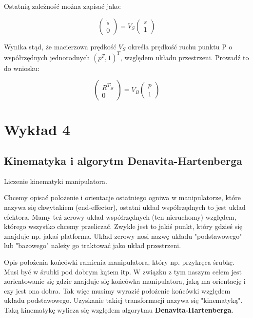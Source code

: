 \documentclass{article}
\begin{document}
Ostatnią zależność można zapisać jako:

$$
    \begin{pmatrix}
        \dot s \\[0.3em]
        0
    \end{pmatrix}
    =V_{S}
    \begin{pmatrix}
        s \\[0.3em]
        1
    \end{pmatrix}
$$

Wynika stąd, że macierzowa prędkość $V_{S}$ określa prędkość ruchu punktu P o współrzędnych jednorodnych $(p^{T}, 1)^{T}$, względem układu przestrzeni. Prowadź to do wniosku:

$$
    \begin{pmatrix}
        R^{T}\dot s \\[0.3em]
        0
    \end{pmatrix}
    =V_{B}
    \begin{pmatrix}
        p \\[0.3em]
        1
    \end{pmatrix}
$$


\newpage

\section{Wykład 4}

\subsection{Kinematyka i algorytm Denavita-Hartenberga}

Liczenie kinematyki manipulatora.

Chcemy opisać położenie i orientacje ostatniego ogniwa w manipulatorze, które nazywa się chwytakiem (end-effector), ostatni układ współrzędnych to jest układ efektora. Mamy też zerowy układ współrzędnych (ten nieruchomy) względem, którego wszystko chcemy przeliczać. Zwykle jest to jakiś punkt, który gdzieś się znajduje np. jakaś platforma. Układ zerowy nosi nazwę układu "podstawowego" lub "bazowego" należy go traktować jako układ przestrzeni.

Opis położenia końcówki ramienia manipulatora, który np. przykręca śrubkę. Musi być w śrubki pod dobrym kątem itp. W związku z tym naszym celem jest zorientowanie się gdzie znajduje się końcówka manipulatora, jaką ma orientację i czy jest ona dobra.
Tak więc musimy wyrazić położenie końcówki względem układu podstawowego. Uzyskanie takiej transformacji nazywa się "kinematyką".
Taką kinematykę wylicza się względem algorytmu {\bf Denavita-Hartenberga}.
\end{document}

